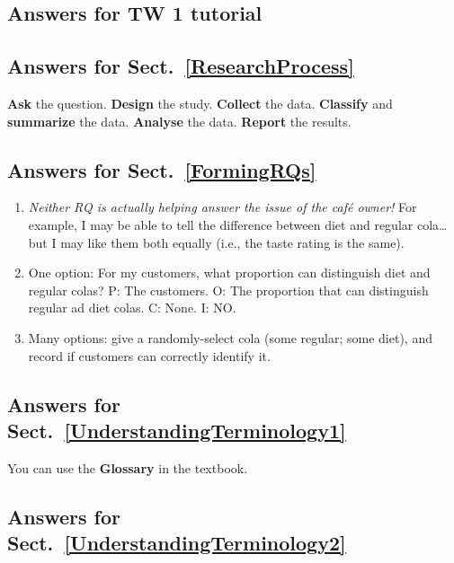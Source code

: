 \documentclass[
  11pt,
  a4paper,
  krantz2]{krantz}
\providecommand{\tightlist}{%
  \setlength{\itemsep}{0pt}\setlength{\parskip}{0pt}}
\begin{document}
\begin{footnotesize}

\section{Answers for TW 1 tutorial}\label{Lecture1Answers}

\subsection*{Answers for Sect.~\ref{ResearchProcess}}\label{answers-for-sect.-refresearchprocess}

\textbf{Ask} the question.
\textbf{Design} the study.
\textbf{Collect} the data.
\textbf{Classify} and \textbf{summarize} the data.
\textbf{Analyse} the data.
\textbf{Report} the results.

\subsection*{Answers for Sect.~\ref{FormingRQs}}\label{answers-for-sect.-refformingrqs}

\begin{enumerate}
\def\labelenumi{\arabic{enumi}.}
\tightlist
\item
  \emph{Neither RQ is actually helping answer the issue of the café owner!}
  For example, I may be able to tell the difference between diet and regular cola\ldots{} but I may like them both equally (i.e., the taste rating is the same).
\item
  One option: For my customers, what proportion can distinguish diet and regular colas?
  P: The customers.
  O: The proportion that can distinguish regular ad diet colas.
  C: None.
  I: NO.
\item
  Many options: give a randomly-select cola (some regular; some diet), and record if customers can correctly identify it.
\end{enumerate}

\subsection*{Answers for Sect.~\ref{UnderstandingTerminology1}}\label{answers-for-sect.-refunderstandingterminology1}

You can use the \textbf{Glossary} in the textbook.

\subsection*{Answers for Sect.~\ref{UnderstandingTerminology2}}\label{answers-for-sect.-refunderstandingterminology2}


\end{footnotesize}
\end{document}
